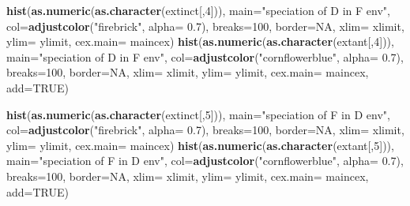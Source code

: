 \documentclass[]{book}
\newenvironment{Shaded}{\begin{snugshade}}{\end{snugshade}}
\newcommand{\KeywordTok}[1]{\textcolor[rgb]{0.13,0.29,0.53}{\textbf{{#1}}}}
\newcommand{\DataTypeTok}[1]{\textcolor[rgb]{0.13,0.29,0.53}{{#1}}}
\newcommand{\DecValTok}[1]{\textcolor[rgb]{0.00,0.00,0.81}{{#1}}}
\newcommand{\FloatTok}[1]{\textcolor[rgb]{0.00,0.00,0.81}{{#1}}}
\newcommand{\StringTok}[1]{\textcolor[rgb]{0.31,0.60,0.02}{{#1}}}
\newcommand{\OtherTok}[1]{\textcolor[rgb]{0.56,0.35,0.01}{{#1}}}
\newcommand{\NormalTok}[1]{{#1}}
\theoremstyle{definition}
\theoremstyle{definition}
\theoremstyle{definition}
\theoremstyle{remark}
\begin{document}
\begin{Shaded}
\begin{Highlighting}[]
\KeywordTok{hist}\NormalTok{(}\KeywordTok{as.numeric}\NormalTok{(}\KeywordTok{as.character}\NormalTok{(extinct[,}\DecValTok{4}\NormalTok{])), }\DataTypeTok{main=}\StringTok{"speciation of D in F env"}\NormalTok{, }\DataTypeTok{col=}\KeywordTok{adjustcolor}\NormalTok{(}\StringTok{"firebrick"}\NormalTok{, }\DataTypeTok{alpha=} \FloatTok{0.7}\NormalTok{), }\DataTypeTok{breaks=}\DecValTok{100}\NormalTok{, }\DataTypeTok{border=}\OtherTok{NA}\NormalTok{, }\DataTypeTok{xlim=}\NormalTok{ xlimit, }\DataTypeTok{ylim=}\NormalTok{ ylimit, }\DataTypeTok{cex.main=}\NormalTok{ maincex)}
\KeywordTok{hist}\NormalTok{(}\KeywordTok{as.numeric}\NormalTok{(}\KeywordTok{as.character}\NormalTok{(extant[,}\DecValTok{4}\NormalTok{])), }\DataTypeTok{main=}\StringTok{"speciation of D in F env"}\NormalTok{, }\DataTypeTok{col=}\KeywordTok{adjustcolor}\NormalTok{(}\StringTok{"cornflowerblue"}\NormalTok{, }\DataTypeTok{alpha=} \FloatTok{0.7}\NormalTok{), }\DataTypeTok{breaks=}\DecValTok{100}\NormalTok{, }\DataTypeTok{border=}\OtherTok{NA}\NormalTok{, }\DataTypeTok{xlim=}\NormalTok{ xlimit, }\DataTypeTok{ylim=}\NormalTok{ ylimit, }\DataTypeTok{cex.main=}\NormalTok{ maincex, }\DataTypeTok{add=}\OtherTok{TRUE}\NormalTok{)}


\KeywordTok{hist}\NormalTok{(}\KeywordTok{as.numeric}\NormalTok{(}\KeywordTok{as.character}\NormalTok{(extinct[,}\DecValTok{5}\NormalTok{])), }\DataTypeTok{main=}\StringTok{"speciation of F in D env"}\NormalTok{, }\DataTypeTok{col=}\KeywordTok{adjustcolor}\NormalTok{(}\StringTok{"firebrick"}\NormalTok{, }\DataTypeTok{alpha=} \FloatTok{0.7}\NormalTok{), }\DataTypeTok{breaks=}\DecValTok{100}\NormalTok{, }\DataTypeTok{border=}\OtherTok{NA}\NormalTok{, }\DataTypeTok{xlim=}\NormalTok{ xlimit, }\DataTypeTok{ylim=}\NormalTok{ ylimit, }\DataTypeTok{cex.main=}\NormalTok{ maincex)}
\KeywordTok{hist}\NormalTok{(}\KeywordTok{as.numeric}\NormalTok{(}\KeywordTok{as.character}\NormalTok{(extant[,}\DecValTok{5}\NormalTok{])), }\DataTypeTok{main=}\StringTok{"speciation of F in D env"}\NormalTok{, }\DataTypeTok{col=}\KeywordTok{adjustcolor}\NormalTok{(}\StringTok{"cornflowerblue"}\NormalTok{, }\DataTypeTok{alpha=} \FloatTok{0.7}\NormalTok{), }\DataTypeTok{breaks=}\DecValTok{100}\NormalTok{, }\DataTypeTok{border=}\OtherTok{NA}\NormalTok{, }\DataTypeTok{xlim=}\NormalTok{ xlimit, }\DataTypeTok{ylim=}\NormalTok{ ylimit, }\DataTypeTok{cex.main=}\NormalTok{ maincex, }\DataTypeTok{add=}\OtherTok{TRUE}\NormalTok{)}


\end{Highlighting}
\end{Shaded}
\end{document}
